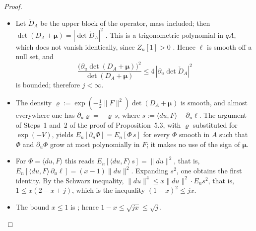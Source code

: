 \documentclass[11pt,letterpaper,reqno]{amsart}
\theoremstyle{definition}
\begin{document}
\begin{proof}
\begin{itemize}
\item[1.] Let $\check D_A$ be the upper block of the operator, mass included; then $\det(D_A+\boldsymbol\mu)=|\det\check D_A|^2$ \cite[Proposition~3.18\,(d)]{QEDII}.
This is a trigonometric polynomial in $qA$, which does not vanish identically, since $Z_n[1]>0$ \cite[Theorem~4.26]{QEDII}.
Hence $\ell$ is smooth off a null set, and
\begin{equation*}
\frac{\bigl(\partial_u\det(D_A+\boldsymbol\mu)\bigr)^2}{\det(D_A+\boldsymbol\mu)}\le4\,|\partial_u\det\check D_A|^2
\end{equation*}
is bounded; therefore $j<\infty$.
\item[2.] The density $\varrho:=\exp(-\frac12\|F\|^2)\det(D_A+\boldsymbol\mu)$ is smooth, and almost everywhere one has $\partial_u\varrho=-\varrho\,s$, where $s:=\langle du,F\rangle-\partial_u\ell$.
The argument of Steps~1 and~2 of the proof of Proposition~5.3, with $\varrho$ substituted for $\exp(-V)$, yields $E_n[\partial_u\Phi]=E_n[\Phi\,s]$ for every $\Phi$ smooth in $A$ such that $\Phi$ and $\partial_u\Phi$ grow at most polynomially in $F$; it makes no use of the sign of $\boldsymbol\mu$.
\item[3.] For $\Phi=\langle du,F\rangle$ this reads $E_n[\langle du,F\rangle\,s]=\|du\|^2$, that is, $E_n[\langle du,F\rangle\,\partial_u\ell]=(x-1)\|du\|^2$.
Expanding $s^2$, one obtains the first identity.
By the Schwarz inequality, $\|du\|^4\le x\|du\|^2\cdot E_ns^2$, that is, $1\le x(2-x+j)$, which is the inequality $(1-x)^2\le jx$.
\item[4.] The bound $x\le1$ is \cite[Theorem~6.27\,(b)]{QEDII}; hence $1-x\le\sqrt{jx}\le\sqrt j$.
\qedhere
\end{itemize}
\end{proof}
\end{document}
